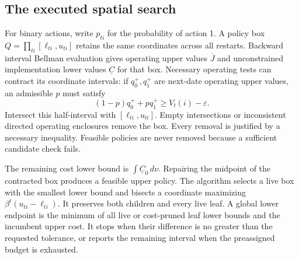 \subsection{The executed spatial search}\label{sec:spatial}
For binary actions, write $p_{ti}$ for the probability of action 1. A policy box $Q=\prod_{ti}[\ell_{ti},u_{ti}]$ retains the same coordinates across all restarts. Backward interval Bellman evaluation gives operating upper values $\overline J$ and unconstrained implementation lower values $\underline C$ for that box. Necessary operating tests can contract its coordinate intervals: if $q_0^+,q_1^+$ are next-date operating upper values, an admissible $p$ must satisfy
\begin{equation}\label{eq:cap}
 (1-p)q_0^++pq_1^+\geq V_t(i)-\varepsilon.
\end{equation}
Intersect this half-interval with $[\ell_{ti},u_{ti}]$. Empty intersections or inconsistent directed operating enclosures remove the box. Every removal is justified by a necessary inequality. Feasible policies are never removed because a sufficient candidate check fails.

The remaining cost lower bound is $\int\underline C_0\,d\nu$. Repairing the midpoint of the contracted box produces a feasible upper policy. The algorithm selects a live box with the smallest lower bound and bisects a coordinate maximizing $\beta^t(u_{ti}-\ell_{ti})$. It preserves both children and every live leaf. A global lower endpoint is the minimum of all live or cost-pruned leaf lower bounds and the incumbent upper cost. It stops when their difference is no greater than the requested tolerance, or reports the remaining interval when the preassigned budget is exhausted.


